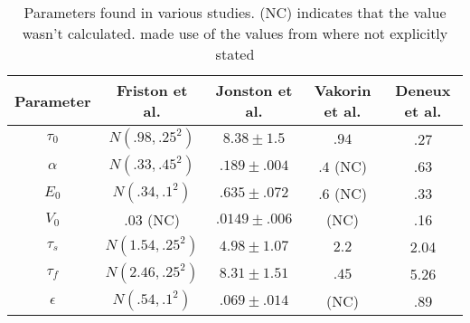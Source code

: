 \begin{table}[t]
\centering
\begin{tabular}{|c || c | c | c | c|}
\hline 
Parameter  & Friston et al. \cite{Friston2000} & Jonston et al. \cite{Johnston2008} 
    & Vakorin et al. \cite{Vakorin2007} & Deneux et al. \cite{Deneux2006}\\
\hline
$\tau_0  $ &  $N(.98 , .25^2)$  & $8.38 \pm 1.5  $ & $.94$ & .27\\
$\alpha  $ &  $N(.33 , .45^2)$  & $.189 \pm .004 $ & $.4$ (NC) & .63 \\
$E_0     $ &  $N(.34 , .1 ^2)$  & $.635 \pm .072 $ & $.6$ (NC) & .33\\
$V_0     $ &  $.03$ (NC)        & $.0149 \pm .006$ & (NC) & .16\\
$\tau_s  $ &  $N(1.54, .25^2)$  & $4.98 \pm 1.07 $ & $2.2$ & 2.04 \\
$\tau_f  $ &  $N(2.46, .25^2)$  & $8.31 \pm 1.51 $ & $.45$ & 5.26\\
$\epsilon$ &  $N(.54 , .1 ^2)$  & $.069 \pm .014 $ & (NC) & .89\\
\hline
\end{tabular}
\caption{Parameters found in various studies. (NC) indicates that the value
wasn't calculated. \cite{Vakorin2007} made use of the values from \cite{Friston2002}
where not explicitly stated}
\label{tab:Params} 
\end{table}

